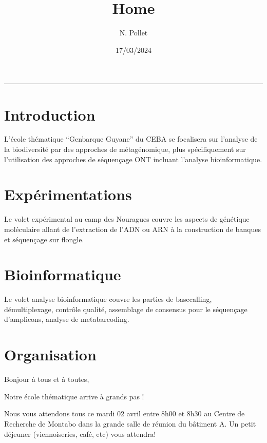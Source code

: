 \documentclass[
]{article}
\title{Home}
\author{N. Pollet}
\date{17/03/2024}
\begin{document}
\maketitle

\begin{center}\rule{0.5\linewidth}{0.5pt}\end{center}

\hypertarget{introduction}{%
\section{Introduction}\label{introduction}}

L'école thématique ``Genbarque Guyane'' du CEBA se focalisera sur
l'analyse de la biodiversité par des approches de métagénomique, plus
spécifiquement sur l'utilisation des approches de séquençage ONT
incluant l'analyse bioinformatique.

\hypertarget{expuxe9rimentations}{%
\section{Expérimentations}\label{expuxe9rimentations}}

Le volet expérimental au camp des Nouragues couvre les aspects de
génétique moléculaire allant de l'extraction de l'ADN ou ARN à la
construction de banques et séquençage sur flongle.

\hypertarget{bioinformatique}{%
\section{Bioinformatique}\label{bioinformatique}}

Le volet analyse bioinformatique couvre les parties de basecalling,
démultiplexage, contrôle qualité, assemblage de consensus pour le
séquençage d'amplicons, analyse de metabarcoding.

\hypertarget{organisation}{%
\section{Organisation}\label{organisation}}

Bonjour à tous et à toutes,

Notre école thématique arrive à grands pas !

Nous vous attendons tous ce mardi 02 avril entre 8h00 et 8h30 au Centre
de Recherche de Montabo dans la grande salle de réunion du bâtiment A.
Un petit déjeuner (viennoiseries, café, etc) vous attendra!
\end{document}
